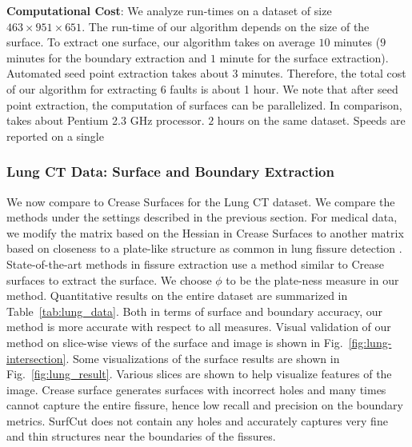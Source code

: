 \documentclass[10pt,journal,compsoc]{IEEEtran}
\newcommand{\comment}[1]{ }
\begin{document}
{\bf Computational Cost}: We analyze run-times on a dataset of size
$463\times 951 \times 651$. The run-time of our algorithm depends on
the size of the surface. To extract one surface, our algorithm takes
on average $10$ minutes ($9$ minutes for the boundary extraction and
$1$ minute for the surface extraction). Automated seed point
extraction takes about 3 minutes. Therefore, the total cost of our
algorithm for extracting 6 faults is about 1 hour. We note that after
seed point extraction, the computation of surfaces can be
parallelized. In comparison, \cite{schultz2010crease} takes about
Pentium 2.3 GHz processor.
$2$ hours on the same dataset.  Speeds are reported on a single

\comment{
Even though the method
\cite{grady2010minimal} requires manual input of the boundary curve of
the surface, we state the time of \cite{grady2010minimal} for surface
extraction. Using Gurobi's state-of-the-art linear programming
implementation, the method takes over 10 hours for a \emph{single}
surface (and the time grows drastically with increasing image
sizes). Ours takes 1 minute given the boundary (both achieve similar
accuracies). Our solution may not achieve the minimal surface as in
\cite{grady2010minimal}, but it does achieve a surface with high
fidelity to the surface of interest. 
}

\subsubsection{Lung CT Data: Surface and Boundary Extraction}

We now compare to Crease Surfaces for the Lung CT dataset. We compare
the methods under the settings described in the previous section. For
medical data, we modify the matrix based on the Hessian in Crease
Surfaces to another matrix based on closeness to a plate-like
structure as common in lung fissure detection
\cite{wiemker2005unsupervised,van2008supervised,xiao2016pulmonary}. State-of-the-art
methods in fissure extraction use a method similar to Crease surfaces
to extract the surface. We choose $\phi$ to be the plate-ness measure in
our method. Quantitative results on the entire dataset are summarized
in Table~\ref{tab:lung_data}. Both in terms of surface and boundary
accuracy, our method is more accurate with respect to all
measures. Visual validation of our method on slice-wise views of the
surface and image is shown in Fig.~\ref{fig:lung-intersection}.  Some
visualizations of the surface results are shown in
Fig.~\ref{fig:lung_result}.  Various slices are shown to help
visualize features of the image. Crease surface generates surfaces
with incorrect holes and many times cannot capture the entire fissure,
hence low recall and precision on the boundary metrics. SurfCut does
not contain any holes and accurately captures very fine and thin
structures near the boundaries of the fissures.
\end{document}
